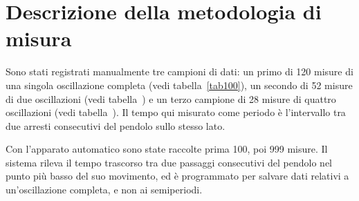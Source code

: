 \documentclass[italian,a4paper,10pt]{article}
\theoremstyle{definition}
\begin{document}
\section{Descrizione della metodologia di misura}
Sono stati registrati manualmente tre campioni di dati: un primo di 120 misure di una singola oscillazione completa (vedi tabella~\ref{tab100}), un secondo di 52 misure di due oscillazioni (vedi tabella~) e un terzo campione di 28 misure di quattro oscillazioni (vedi tabella~). Il tempo qui misurato come periodo è l'intervallo tra due arresti consecutivi del pendolo sullo stesso lato.

Con l'apparato automatico sono state raccolte prima 100, poi 999 misure. Il sistema rileva il tempo trascorso tra due passaggi consecutivi del pendolo nel punto più basso del suo movimento, ed è programmato per salvare dati relativi a un'oscillazione completa, e non ai semiperiodi.
\newpage
\end{document}
